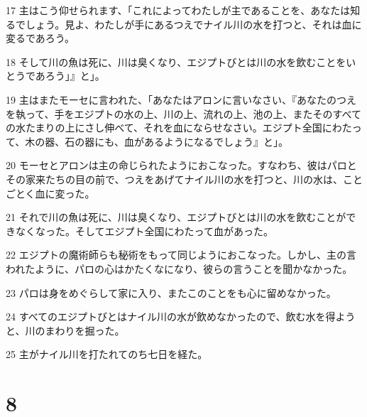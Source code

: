 \par 17 主はこう仰せられます、「これによってわたしが主であることを、あなたは知るでしょう。見よ、わたしが手にあるつえでナイル川の水を打つと、それは血に変るであろう。
\par 18 そして川の魚は死に、川は臭くなり、エジプトびとは川の水を飲むことをいとうであろう」』と」。
\par 19 主はまたモーセに言われた、「あなたはアロンに言いなさい、『あなたのつえを執って、手をエジプトの水の上、川の上、流れの上、池の上、またそのすべての水たまりの上にさし伸べて、それを血にならせなさい。エジプト全国にわたって、木の器、石の器にも、血があるようになるでしょう』と」。
\par 20 モーセとアロンは主の命じられたようにおこなった。すなわち、彼はパロとその家来たちの目の前で、つえをあげてナイル川の水を打つと、川の水は、ことごとく血に変った。
\par 21 それで川の魚は死に、川は臭くなり、エジプトびとは川の水を飲むことができなくなった。そしてエジプト全国にわたって血があった。
\par 22 エジプトの魔術師らも秘術をもって同じようにおこなった。しかし、主の言われたように、パロの心はかたくなになり、彼らの言うことを聞かなかった。
\par 23 パロは身をめぐらして家に入り、またこのことをも心に留めなかった。
\par 24 すべてのエジプトびとはナイル川の水が飲めなかったので、飲む水を得ようと、川のまわりを掘った。
\par 25 主がナイル川を打たれてのち七日を経た。

\chapter{8}

